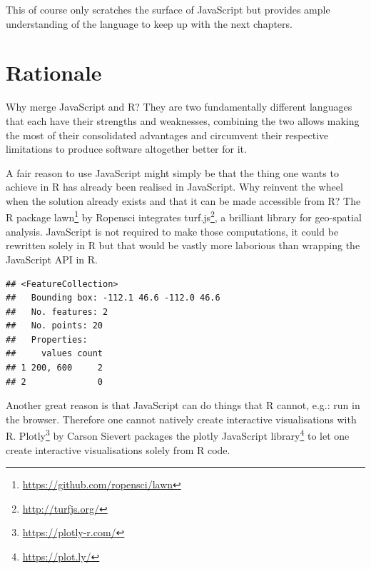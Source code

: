 \documentclass[
]{krantz}
\makeatletter
\newenvironment{Shaded}{\begin{snugshade}}{\end{snugshade}}
\newcommand{\KeywordTok}[1]{\textcolor[rgb]{0.27,0.27,0.27}{\textbf{#1}}}
\newcommand{\NormalTok}[1]{#1}
\newcommand{\OperatorTok}[1]{\textcolor[rgb]{0.43,0.43,0.43}{\textbf{#1}}}
\newcommand{\StringTok}[1]{\textcolor[rgb]{0.5,0.5,0.5}{#1}}
\renewcommand{\href}[2]{#2\footnote{\url{#1}}}
\newenvironment{kframe}{%
\medskip{}
\setlength{\fboxsep}{.8em}
 \def\at@end@of@kframe{}%
 \ifinner\ifhmode%
  \def\at@end@of@kframe{\end{minipage}}%
  \begin{minipage}{\columnwidth}%
 \fi\fi%
 \def\FrameCommand##1{\hskip\@totalleftmargin \hskip-\fboxsep
 \colorbox{shadecolor}{##1}\hskip-\fboxsep
     \hskip-\linewidth \hskip-\@totalleftmargin \hskip\columnwidth}%
 \MakeFramed {\advance\hsize-\width
   \@totalleftmargin\z@ \linewidth\hsize
   \@setminipage}}%
 {\par\unskip\endMakeFramed%
 \at@end@of@kframe}
\renewenvironment{Shaded}{\begin{kframe}}{\end{kframe}}
\makeatother
\begin{document}
This of course only scratches the surface of JavaScript but provides ample understanding of the language to keep up with the next chapters.

\hypertarget{rationale}{%
\section*{Rationale}\label{rationale}}


Why merge JavaScript and R? They are two fundamentally different languages that each have their strengths and weaknesses, combining the two allows making the most of their consolidated advantages and circumvent their respective limitations to produce software altogether better for it.

A fair reason to use JavaScript might simply be that the thing one wants to achieve in R has already been realised in JavaScript. Why reinvent the wheel when the solution already exists and that it can be made accessible from R? The R package \href{https://github.com/ropensci/lawn}{lawn} \citep{R-lawn} by Ropensci integrates \href{http://turfjs.org/}{turf.js}, a brilliant library for geo-spatial analysis. JavaScript is not required to make those computations, it could be rewritten solely in R but that would be vastly more laborious than wrapping the JavaScript API in R.

\begin{Shaded}
\end{Shaded}

\begin{verbatim}
## <FeatureCollection>
##   Bounding box: -112.1 46.6 -112.0 46.6
##   No. features: 2
##   No. points: 20
##   Properties: 
##     values count
## 1 200, 600     2
## 2              0
\end{verbatim}

Another great reason is that JavaScript can do things that R cannot, e.g.: run in the browser. Therefore one cannot natively create interactive visualisations with R. \href{https://plotly-r.com/}{Plotly} \citep{R-plotly} by Carson Sievert packages the \href{https://plot.ly/}{plotly JavaScript library} to let one create interactive visualisations solely from R code.
\end{document}
